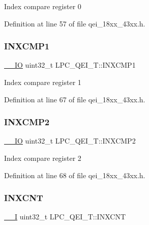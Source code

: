 Index compare register 0 

Definition at line 57 of file qei\+\_\+18xx\+\_\+43xx.\+h.

\mbox{\label{struct_l_p_c___q_e_i___t_a69a6150f42d9c8f9ed52c305c72bd72f}} 
\subsubsection{\texorpdfstring{I\+N\+X\+C\+M\+P1}{INXCMP1}}
{\footnotesize\ttfamily \hyperlink{core__sc300_8h_aec43007d9998a0a0e01faede4133d6be}{\+\_\+\+\_\+\+IO} uint32\+\_\+t L\+P\+C\+\_\+\+Q\+E\+I\+\_\+\+T\+::\+I\+N\+X\+C\+M\+P1}

Index compare register 1 

Definition at line 67 of file qei\+\_\+18xx\+\_\+43xx.\+h.

\mbox{\label{struct_l_p_c___q_e_i___t_a19ba8a85129824ec0259b6733baff660}} 
\subsubsection{\texorpdfstring{I\+N\+X\+C\+M\+P2}{INXCMP2}}
{\footnotesize\ttfamily \hyperlink{core__sc300_8h_aec43007d9998a0a0e01faede4133d6be}{\+\_\+\+\_\+\+IO} uint32\+\_\+t L\+P\+C\+\_\+\+Q\+E\+I\+\_\+\+T\+::\+I\+N\+X\+C\+M\+P2}

Index compare register 2 

Definition at line 68 of file qei\+\_\+18xx\+\_\+43xx.\+h.

\mbox{\label{struct_l_p_c___q_e_i___t_ae5f756b6037664715b3157f6b6953e42}} 
\subsubsection{\texorpdfstring{I\+N\+X\+C\+NT}{INXCNT}}
{\footnotesize\ttfamily \hyperlink{core__sc300_8h_af63697ed9952cc71e1225efe205f6cd3}{\+\_\+\+\_\+I} uint32\+\_\+t L\+P\+C\+\_\+\+Q\+E\+I\+\_\+\+T\+::\+I\+N\+X\+C\+NT}

